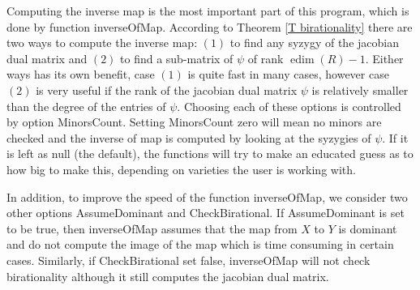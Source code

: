\documentclass[12pt]{amsart}
\numberwithin{equation}{theorem}
\renewcommand{\:}{\colon}
\DeclareMathOperator{\edim}{edim}
\theoremstyle{theorem}
\begin{document}
Computing the inverse map is the most important part of this program, which is done by function {\sc inverseOfMap}. According to Theorem \ref{T birationality} there are two ways to compute the inverse map: $(1)$ to find any syzygy of the jacobian dual matrix and $(2)$ to find a sub-matrix of $\psi$ of rank $\edim(R)-1$. Either ways has its own benefit, case $(1)$ is quite fast in many cases, however case $(2)$ is very useful if the rank of the jacobian dual matrix  $\psi$ is relatively smaller than the degree of the entries of $\psi$. Choosing each of these options is controlled by option {\sc MinorsCount}. Setting {\sc MinorsCount} zero will mean no minors are checked and the inverse of map is computed by looking at the syzygies of $\psi$.  If it is left as null (the default), the functions will try to make an educated guess as to how big to make this, depending on varieties the user is working with.
 
 In addition, to improve the speed of the function {\sc inverseOfMap}, we consider two other options {\sc AssumeDominant} and {\sc CheckBirational}. If {\sc AssumeDominant} is set  to be true,  then  {\sc inverseOfMap} assumes that the map from $X$ to $Y$ is dominant and do not compute the image of the map which is time consuming in certain cases.
 Similarly, if {\sc CheckBirational} set false, {\sc inverseOfMap} will  not check birationality although it still computes the jacobian dual matrix. 
 
\end{document}
